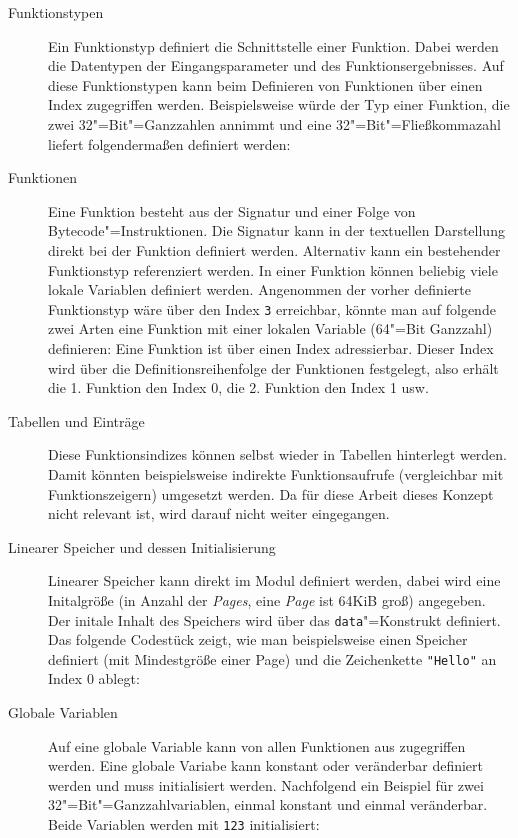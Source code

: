 \begin{description}
    \item[Funktionstypen] Ein Funktionstyp definiert die Schnittstelle einer Funktion. Dabei werden die Datentypen der Eingangsparameter und des Funktionsergebnisses. Auf diese Funktionstypen kann beim Definieren von Funktionen über einen Index zugegriffen werden. Beispielsweise würde der Typ einer Funktion, die zwei 32"=Bit"=Ganzzahlen annimmt und eine 32"=Bit"=Fließkommazahl liefert folgendermaßen definiert werden: 
    \item[Funktionen] Eine Funktion besteht aus der Signatur und einer Folge von Bytecode"=Instruktionen. Die Signatur kann in der textuellen Darstellung direkt bei der Funktion definiert werden. Alternativ kann ein bestehender Funktionstyp referenziert werden. In einer Funktion können beliebig viele lokale Variablen definiert werden. Angenommen der vorher definierte Funktionstyp wäre über den Index \lstinline{3} erreichbar, könnte man auf folgende zwei Arten eine Funktion mit einer lokalen Variable (64"=Bit Ganzzahl) definieren: 
    Eine Funktion ist über einen Index adressierbar. Dieser Index wird über die Definitionsreihenfolge der Funktionen festgelegt, also erhält die 1. Funktion den Index 0, die 2. Funktion den Index 1 usw.
    \item[Tabellen und Einträge] Diese Funktionsindizes können selbst wieder in Tabellen hinterlegt werden. Damit könnten beispielsweise indirekte Funktionsaufrufe (vergleichbar mit Funktionszeigern) umgesetzt werden. Da für diese Arbeit dieses Konzept nicht relevant ist, wird darauf nicht weiter  eingegangen.
    \item[Linearer Speicher und dessen Initialisierung] Linearer Speicher kann direkt im Modul definiert werden, dabei wird eine Initalgröße (in Anzahl der \emph{Pages}, eine \emph{Page} ist 64KiB groß) angegeben. Der initale Inhalt des Speichers wird über das \lstinline{data}"=Konstrukt definiert. Das folgende Codestück zeigt, wie man beispielsweise einen Speicher definiert (mit Mindestgröße einer Page) und die Zeichenkette \lstinline{"Hello"} an Index 0 ablegt: 
    \item[Globale Variablen] Auf eine globale Variable kann von allen Funktionen aus zugegriffen werden. Eine globale Variabe kann konstant oder veränderbar definiert werden und muss initialisiert werden. Nachfolgend ein Beispiel für zwei 32"=Bit"=Ganzzahlvariablen, einmal konstant und einmal veränderbar. Beide Variablen werden mit \lstinline{123} initialisiert: 

\end{description}
